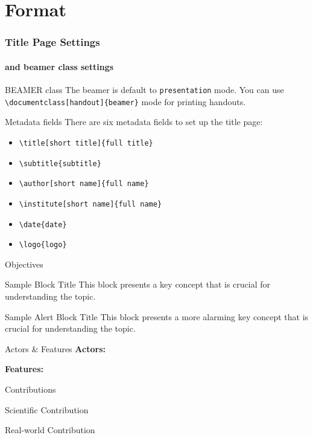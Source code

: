 \section{Format} 

\begin{frame}
  \frametitle{Title Page Settings}
  \framesubtitle{and beamer class settings}
  
  \par{BEAMER class} 
  The beamer is default to \Verb|presentation| mode. 
  You can use \Verb|\documentclass[handout]{beamer}| mode for printing handouts.

  \par{Metadata fields} 
  There are six metadata fields to set up the title page:
  \begin{itemize}
    \item \Verb|\title[short title]{full title}|
    \item \Verb|\subtitle{subtitle}|
    \item \Verb|\author[short name]{full name}|
    \item \Verb|\institute[short name]{full name}|
    \item \Verb|\date{date}|
    \item \Verb|\logo{logo}|
  \end{itemize}
\end{frame}

\begin{frame}[label=objectives]{Objectives 
  \hyperlink{scope}{}
}
	\begin{block}{Sample Block Title}
		This block presents a \alert{key concept} that is crucial for understanding the topic.
	\end{block}
	\begin{alertblock}{Sample Alert Block Title}
		This block presents a more alarming \alert{key concept} that is crucial for understanding the topic.
	\end{alertblock}
	\note{}
\end{frame}

\begin{frame}{Actors \& Features}
	\textbf{Actors:}
									
	\textbf{Features:}
	\note{}
\end{frame}


\begin{frame}{Contributions}				
	\begin{block}{Scientific Contribution}
	\end{block}						
	\begin{block}{Real-world Contribution}
	\end{block}					
	\note{}
\end{frame}